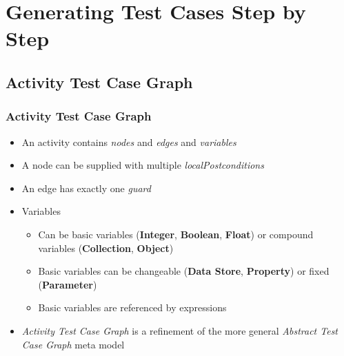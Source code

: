 \documentclass{beamer}
\newcommand{\UMLType}[1]{\textbf{#1}}
\begin{document}


\section{Generating Test Cases Step by Step}
\subsection{Activity Test Case Graph}

\begin{frame}
\frametitle{Activity Test Case Graph}
\begin{itemize}
\item An activity contains \emph{nodes} and \emph{edges} and \emph{variables}
\item A node can be supplied with multiple \emph{localPostconditions}
\item An edge has exactly one \emph{guard}
\item Variables
\begin{itemize}
\item Can be basic variables (\UMLType{Integer}, \UMLType{Boolean}, \UMLType{Float}) or compound variables (\UMLType{Collection}, \UMLType{Object})
\item Basic variables can be changeable (\UMLType{Data Store}, \UMLType{Property}) or fixed (\UMLType{Parameter})
\item Basic variables are referenced by expressions
\end{itemize}
\item \emph{Activity Test Case Graph} is a refinement of the more general \emph{Abstract Test Case Graph} meta model
\end{itemize}
\end{frame}
\end{document}
